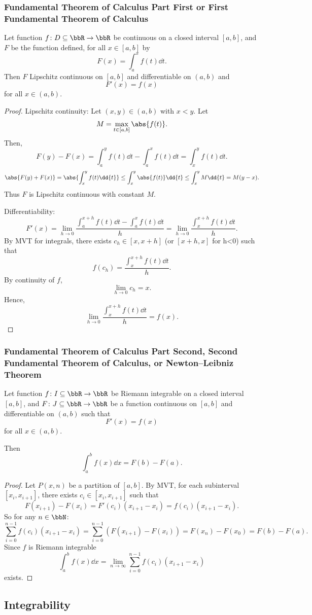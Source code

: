 \subsubsection{Fundamental Theorem of Calculus Part First or First Fundamental Theorem of Calculus}
Let function $f\colon D\subseteq\bbR\to\bbR$ be continuous on a closed interval $[a,b]$, and $F$ be the function defined, for all $x\in[a,b]$ by
\[F(x)=\int_a^xf(t)\dd{t}.\]
Then $F$ Lipschitz continuous on $[a,b]$ and differentiable on $(a,b)$ and
\[F'(x)=f(x)\]
for all $x\in (a,b)$.
\begin{proof}
Lipschitz continuity: Let $(x,y)\in(a,b)$ with $x<y$. Let
\[M=\max_{t\in[a,b]}\abs{f(t)}.\]
Then,
\[F(y)-F(x)=\int_a^yf(t)\dd{t}-\int_a^xf(t)\dd{t}=\int_x^yf(t)\dd{t}.\]
\[\abs{F(y)+F(x)}=\abs{\int_x^yf(t)\dd{t}}\leq\int_x^y\abs{f(t)}\dd{t}\leq\int_x^yM\dd{t}=M(y-x).\]
Thus $F$ is Lipschitz continuous with constant $M$.

Differentiability:
\[F'(x)=\lim_{h\to 0}\frac{\int_a^{x+h}f(t)\dd{t}-\int_a^xf(t)\dd{t}}{h}=\lim_{h\to 0}\frac{\int_x^{x+h}f(t)\dd{t}}{h}.\]
By MVT for integrals, there exists $c_h\in[x,x+h]$ (or $[x+h,x]$ for h<0) such that
\[f(c_h)=\frac{\int_x^{x+h}f(t)\dd{t}}{h}.\]
By continuity of $f$,
\[\lim_{h\to 0}c_h=x.\]
Hence,
\[\lim_{h\to 0}\frac{\int_x^{x+h}f(t)\dd{t}}{h}=f(x).\]
\end{proof}
\subsubsection{Fundamental Theorem of Calculus Part Second, Second Fundamental Theorem of Calculus, or Newton–Leibniz Theorem}
Let function $f\colon I\subseteq\bbR\to\bbR$ be Riemann integrable on a closed interval $[a,b]$, and $F\colon J\subseteq\bbR\to\bbR$ be a function continuous on $[a,b]$ and differentiable on $(a,b)$ such that
\[F'(x)=f(x)\]
for all $x\in (a,b)$.

Then
\[\int_a^bf(x)\dd{x}=F(b)-F(a).\]
\begin{proof}
Let $P(x,n)$ be a partition of $[a,b]$. By MVT, for each subinterval $[x_i,x_{i+1}]$, there exists $c_i\in[x_i,x_{i+1}]$ such that
\[F(x_{i+1})-F(x_i)=F'(c_i)(x_{i+1}-x_i)=f(c_i)(x_{i+1}-x_i).\]
So for any $n\in\bbN$:
\[\sum_{i=0}^{n-1}f(c_i)(x_{i+1}-x_i)=\sum_{i=0}^{n-1}(F(x_{i+1})-F(x_i))=F(x_n)-F(x_0)=F(b)-F(a).\]
Since $f$ is Riemann integrable
\[\int_a^bf(x)\dd{x}=\lim_{n\to\infty}\sum_{i=0}^{n-1}f(c_i)(x_{i+1}-x_i)\]
exists.
\end{proof}
\subsection{Integrability}

